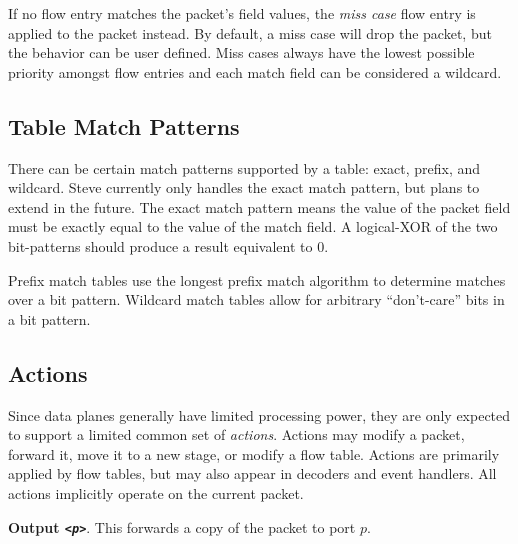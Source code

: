 If no flow entry matches the packet's field values, the \emph{miss case} flow
entry is applied to the packet instead. By default, a miss case will drop the
packet, but the behavior can be user defined. Miss cases always have the lowest
possible priority amongst flow entries and each match field can be considered a
wildcard.


\subsection{Table Match Patterns} \label{tut:match_patterns}

There can be certain match patterns supported by a table: exact, prefix, and wildcard. Steve currently only handles the exact match pattern, but plans to extend in the future. The exact match pattern means the value of the packet field must be exactly equal to the value of the match field. A logical-XOR of the two bit-patterns should produce a result equivalent to 0.

Prefix match tables use the longest prefix match algorithm to determine
matches over a bit pattern.
Wildcard match tables allow for arbitrary ``don't-care'' bits in a bit pattern.

\subsection{Actions} \label{action_desc}

Since data planes generally have limited processing power, they are only
expected to support a limited common set of \emph{actions}.
Actions may modify a packet, forward it, move it to a new stage, or modify a
flow table. 
Actions are primarily applied by flow tables, but may also appear in decoders
and event handlers. All actions implicitly operate on the current packet.


\textbf{Output \emph{\texttt{<p>}}}. This forwards a copy of the packet to port $p$.

